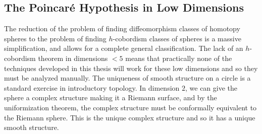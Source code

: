 \subsection{The Poincar\'e Hypothesis in Low Dimensions}

The reduction of the problem of finding diffeomorphism classes of homotopy spheres to the problem of finding $h$-cobordism classes of spheres is a massive simplification, and allows for a complete general classification.
The lack of an $h$-cobordism theorem in dimensions $<5$ means that practically none of the techniques developed in this thesis will work for these low dimensions and so they must be analyzed manually. The uniqueness of smooth structure on a circle is a standard exercise in introductory topology. In dimension $2$, we can give the sphere a complex structure making it a Riemann surface, and by the uniformization theorem, the complex structure must be conformally equivalent to the Riemann sphere. This is the unique complex structure and so it has a unique smooth structure.

